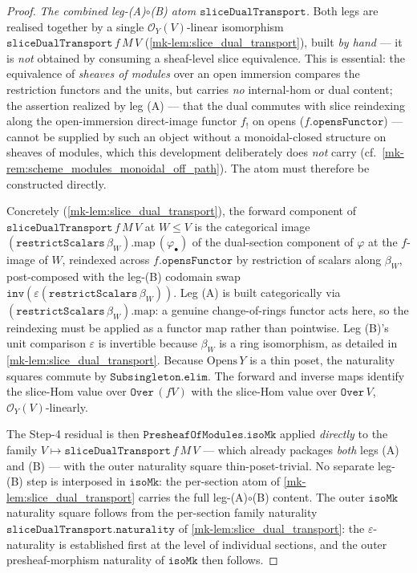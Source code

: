 \begin{proof}
  \emph{The combined leg-(A)\(\circ\)(B) atom \(\mathtt{sliceDualTransport}\).} Both legs are
  realised together by a single \(\mathcal{O}_Y(V)\)-linear isomorphism
  \(\mathtt{sliceDualTransport}\,f\,M\,V\) (\ref{mk-lem:slice_dual_transport}), built
  \emph{by hand} --- it is \emph{not} obtained by consuming a sheaf-level slice equivalence.
  This is essential: the equivalence of \emph{sheaves of modules} over an open immersion
  compares the restriction functors and the units, but carries \emph{no} internal-hom or
  dual content; the assertion realized by leg (A) --- that the dual commutes with slice
  reindexing along the open-immersion direct-image functor \(f_{!}\) on opens
  (\(f.\mathtt{opensFunctor}\)) --- cannot be supplied by such an object without a
  monoidal-closed structure on sheaves of modules, which this development deliberately does
  \emph{not} carry (cf.\ \ref{mk-rem:scheme_modules_monoidal_off_path}). The atom must
  therefore be constructed directly.

  Concretely (\ref{mk-lem:slice_dual_transport}), the forward component of
  \(\mathtt{sliceDualTransport}\,f\,M\,V\) at \(W \le V\) is the categorical image
  \((\mathtt{restrictScalars}\,\beta_W).\mathrm{map}\,(\varphi_{\bullet})\) of the dual-section
  component of \(\varphi\) at the \(f\)-image of \(W\), reindexed across
  \(f.\mathtt{opensFunctor}\) by restriction of scalars along \(\beta_W\), post-composed with
  the leg-(B) codomain swap \(\mathtt{inv}(\varepsilon(\mathtt{restrictScalars}\,\beta_W))\).
  Leg (A) is built categorically via \((\mathtt{restrictScalars}\,\beta_W).\mathrm{map}\):
  a genuine change-of-rings functor acts here, so the reindexing must be applied as a
  functor map rather than pointwise. Leg (B)'s unit comparison \(\varepsilon\) is invertible
  because \(\beta_W\) is a ring isomorphism, as detailed in \ref{mk-lem:slice_dual_transport}.
  Because \(\mathrm{Opens}\,Y\) is a thin poset, the
  naturality squares commute by \(\mathtt{Subsingleton.elim}\). The forward and inverse maps
  identify the slice-Hom value over \(\mathtt{Over}\,(fV)\) with the slice-Hom value over
  \(\mathtt{Over}\,V\), \(\mathcal{O}_Y(V)\)-linearly.

  The Step-4 residual is then \(\mathtt{PresheafOfModules.isoMk}\) applied \emph{directly} to
  the family \(V \mapsto \mathtt{sliceDualTransport}\,f\,M\,V\) --- which already packages
  \emph{both} legs (A) and (B) --- with the outer naturality square thin-poset-trivial. No
  separate leg-(B) step is interposed in \(\mathtt{isoMk}\): the per-section atom of
  \ref{mk-lem:slice_dual_transport} carries the full leg-(A)\(\circ\)(B) content. The outer
  \(\mathtt{isoMk}\) naturality square follows from the per-section family naturality
  \(\mathtt{sliceDualTransport.naturality}\) of \ref{mk-lem:slice_dual_transport}: the
  \(\varepsilon\)-naturality is established first at the level of individual sections, and the
  outer presheaf-morphism naturality of \(\mathtt{isoMk}\) then follows.


\end{proof}
